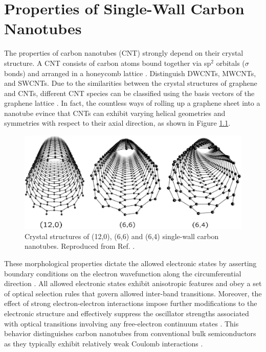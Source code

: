 \chapter{Properties of Single-Wall Carbon Nanotubes}

The properties of carbon nanotubes (CNT) strongly depend on their crystal structure. A CNT consists of carbon atoms bound together via sp$^2$ orbitals ($\sigma$ bonds) and arranged in a honeycomb lattice \cite{soavi2016ultrafast}. {\color{red} Distinguish DWCNTs, MWCNTs, and SWCNTs}. Due to the similarities between the crystal structures of graphene and CNTs, different CNT species can be classified using the basis vectors of the graphene lattice \cite{charlier2007electronic}. In fact, the countless ways of rolling up a graphene sheet into a nanotube evince that CNTs can exhibit varying helical geometries and symmetries with respect to their axial direction, as shown in Figure \ref{fig:symmetries}. 

\begin{figure}[h]
	\centering
	\includegraphics[scale=0.4]{images/chapter_optical_props/nanotube_symmetries_charlier}
	\caption{Crystal structures of (12,0), (6,6) and (6,4) single-wall carbon nanotubes. Reproduced from Ref. \cite{charlier2007electronic}.}
	\label{fig:symmetries}
\end{figure}
These morphological properties dictate the allowed electronic states by asserting boundary conditions on the electron wavefunction along the circumferential direction \cite{charlier2007electronic}. All allowed electronic states exhibit anisotropic features and obey a set of optical selection rules that govern allowed inter-band transitions. Moreover, the effect of strong electron-electron interactions impose further modifications to the electronic structure and effectively suppress the oscillator strengths associated with optical transitions involving any free-electron continuum states \cite{ando1997excitons}. This behavior distinguishes carbon nanotubes from conventional bulk semiconductors as they typically exhibit relatively weak Coulomb interactions \cite{ando1997excitons}.




